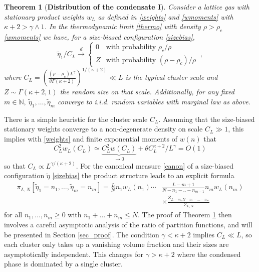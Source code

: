 \documentclass[pdflatex,sn-mathphys-num]{sn-jnl}%
\theoremstyle{thmstyleone}%
\newtheorem{theorem}{Theorem}%
\theoremstyle{thmstyletwo}%
\theoremstyle{thmstylethree}%
\begin{document}
\begin{theorem}[\textbf{Distribution of the condensate I}]\label{cluster}
Consider a lattice gas with stationary product weights $w_L$ as defined in \eqref{weights} and \eqref{wmoments} with $\kappa +2>\gamma \wedge 1$. 
In the thermodynamic limit \eqref{thermo} with density $\rho > \rho_c$ \eqref{wmoments} we have, for a size-biased configuration \eqref{sizebias},
\begin{equation*}
\tilde{\eta}_1/C_L \overset{d}{\longrightarrow} 
\begin{cases}
    0 & \text{with probability } \rho_c/\rho \\
    Z & \text{with probability } (\rho-\rho_c)/\rho
\end{cases}\ ,
\end{equation*}
where $C_L = \left(\frac{(\rho-\rho_c) L^\gamma}{\theta \Gamma(\kappa+2)}\right)^{1 /(\kappa +2)} \ll L$ is the typical cluster scale and $Z \sim \Gamma(\kappa +2, 1)$ the random size on that scale. 
Additionally, for any fixed $m \in \mathbb{N},\ \tilde{\eta}_1, \dots, \tilde{\eta}_m$ converge to i.i.d. random variables with marginal law as above.
\end{theorem}
\vspace*{-3mm}
There is a simple heuristic for the cluster scale $C_L$. Assuming that the size-biased stationary weights converge to a non-degenerate density on scale $C_L \gg 1$, this implies with \eqref{weights} and finite exponential moments of $w(n)$ that
\[
C_L^2 w_L (C_L )\simeq \underbrace{C_L^2 w(C_L )}_{\to 0} +\theta C_L^{\kappa +2} /L^\gamma =O(1)
\]
so that $C_L \propto L^{\gamma /(\kappa +2)}$. 
For the canonical measure \eqref{canon} of a size-biased configuration $\tilde\eta$ \eqref{sizebias} the product structure leads to an explicit formula
\begin{align}
\pi_{L,N} [\tilde\eta_1 =n_1 ,\ldots ,\tilde\eta_m =n_m ]=\frac{L}{N} n_1 w_L (n_1 )\cdots &\frac{L-m+1}{N-n_1 -..-n_{m-1}} n_m w_L (n_m )\nonumber\\
&\times\frac{Z_{L-m,N-n_1 -\ldots-n_m}}{Z_{L,N}}
\label{sbformula}
\end{align}
for all $n_1 ,\ldots ,n_m \geq 0$ with $n_1 +\ldots +n_m \leq N$. 
The proof of Theorem \ref{cluster} then involves a careful asymptotic analysis of the ratio of partition functions, and will be presented in Section \ref{sec_proof}. 
The condition $\gamma <\kappa +2$ implies $C_L \ll L$, so each cluster only takes up a vanishing volume fraction and their sizes are asymptotically independent. This changes for $\gamma >\kappa +2$ where the condensed phase is dominated by a single cluster.
\end{document}
